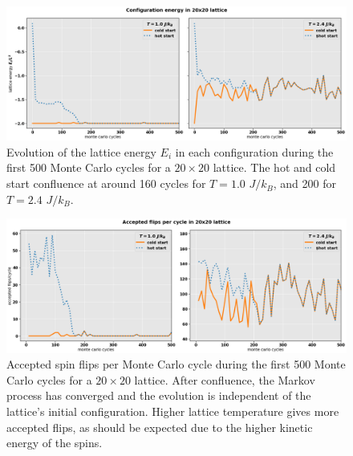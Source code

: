 \documentclass[]{article}
\begin{document}
\begin{figure}[!h]
	\centering
	\includegraphics[width=1\linewidth]{./figs/20x20-config-energy.png}
	\caption{Evolution of the lattice energy $E_i$ in each configuration during the first 500 Monte Carlo cycles for a $20 \times 20$ lattice. The hot and cold start confluence at around 160 cycles for $T = 1.0$ $J/k_B$, and 200 for $T = 2.4$ $J/k_B$.}
	\label{fig:20x20-config-energy}
\end{figure}

\begin{figure}[!h]
	\centering
	\includegraphics[width=1\linewidth]{./figs/20x20-flips-per-cycle.png}
	\caption{Accepted spin flips per Monte Carlo cycle during the first 500 Monte Carlo cycles for a $20 \times 20$ lattice. After confluence, the Markov process has converged and the evolution is independent of the lattice's initial configuration. Higher lattice temperature gives more accepted flips, as should be expected due to the higher kinetic energy of the spins.}
	\label{fig:20x20-flips-per-cycle}
\end{figure}
\end{document}
